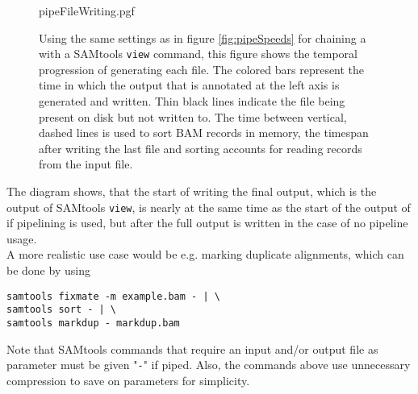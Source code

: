 \begin{figure}[t]
        {pipeFileWriting.pgf}
    \caption{Using the same settings as in figure \ref{fig:pipeSpeeds} for chaining a \sort with a SAMtools \texttt{view} command, this figure shows the temporal progression of generating each file. The colored bars represent the time in which the output that is annotated at the left axis is generated and written. Thin black lines indicate the file being present on disk but not written to. The time between vertical, dashed lines is used to sort BAM records in memory, the timespan after writing the last file and sorting accounts for reading records from the input file. }
    \label{fig:pipeWrite}
\end{figure}
The diagram shows, that the start of writing the final output, which is the output of SAMtools \texttt{view}, is nearly at the same time as the start of the output of \sort if pipelining is used, but after the full output is written in the case of no pipeline usage. \\
A more realistic use case would be e.g. marking duplicate alignments, which can be done by using 
\begin{verbatim} 
samtools fixmate -m example.bam - | \
samtools sort - | \ 
samtools markdup - markdup.bam
\end{verbatim}
Note that SAMtools commands that require an input and/or output file as parameter must be given "\texttt{-}" if piped. Also, the commands above use unnecessary compression to save on parameters for simplicity. \\

